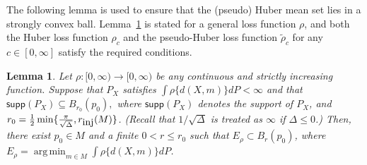 \documentclass[preprint]{imsart}
\DeclareMathOperator*{\argmin}{arg\,min}
\theoremstyle{plain}
\newtheorem{lemma}{Lemma}
\theoremstyle{remark}
\begin{document}
\begin{appendix}





The following lemma is used to ensure that the (pseudo) Huber mean set lies in a strongly convex ball. Lemma~\ref{lem:contain:ball} is stated for a general loss function $\rho$, and both the Huber loss function $\rho_c$ and the pseudo-Huber loss function $\tilde{\rho}_{c}$ for any $c \in [0,\infty]$ satisfy the required conditions. 




\begin{lemma}\label{lem:contain:ball}
Let $\rho: [0, \infty) \to [0, \infty)$ be any continuous and strictly increasing function. Suppose that $P_{X}$ satisfies 
$\int \rho\{d(X,m)\} dP < \infty$
and that
$\textsf{supp}(P_{X}) \subseteq B_{r_0}(p_0),$ 
where $\textsf{supp}(P_{X})$ denotes the support of $P_{X}$,  and $r_0 = \frac{1}{2}\min\{\frac{\pi}{\sqrt{\Delta}}  , r_{\mbox{\tiny inj}}(M) \}$. (Recall that $1/\sqrt{\Delta}$ is treated as $\infty$ if $\Delta \le 0$.)
Then, there exist $p_0 \in M$ and a finite $0 <r \le r_0$ such that $E_{\rho} \subset B_r(p_0)$, where 
$E_{\rho} = \argmin_{m \in M} \int \rho\{d(X,m)\} dP$.
\end{lemma}




\end{appendix}
\end{document}

